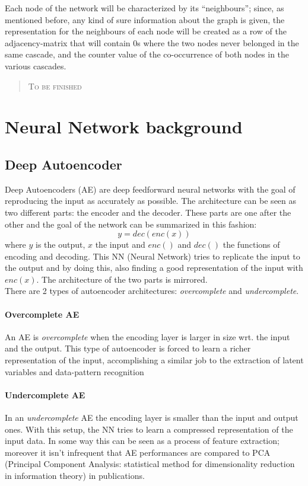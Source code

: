 \documentclass{article}
\begin{document}
			Each node of the network will be characterized by its \textquotedblleft neighbours\textquotedblright; since, as mentioned before, any kind of sure information about the graph is given, the representation for the neighbours of each node will be created as a row of the adjacency-matrix that will contain 0s where the two nodes never belonged in the same cascade, and the counter value of the co-occurrence of both nodes in the various cascades.
			\begin{quote}
				\centering
				\textsc{To be finished}\\
			\end{quote}
			\newpage
			
		\section{Neural Network background}
			\subsection{Deep Autoencoder}
			Deep Autoencoders (AE) are deep feedforward neural networks with the goal of reproducing the input as accurately as possible. The architecture can be seen as two different parts: the encoder and the decoder. These parts are one after the other and the goal of the network can be summarized in this fashion:
			$$y=dec(enc(x))$$
			where $y$ is the output, $x$ the input and $enc()$ and $dec()$ the functions of encoding and decoding. This NN (Neural Network) tries to replicate the input to the output and by doing this, also finding a good representation of the input with $enc(x)$. The architecture of the two parts is mirrored.\\
			There are 2 types of autoencoder architectures: \textit{overcomplete} and \textit{undercomplete}.
			\paragraph{Overcomplete AE}
			An AE is \textit{overcomplete} when the encoding layer is larger in size wrt. the input and the output. This type of autoencoder is forced to learn a richer representation of the input, accomplishing a similar job to the extraction of latent variables and data-pattern recognition
			\paragraph{Undercomplete AE}
			In an \textit{undercomplete} AE the encoding layer is smaller than the input and output ones. With this setup, the NN tries to learn a compressed representation of the input data. In some way this can be seen as a process of feature extraction; moreover it isn't infrequent that AE performances are compared to PCA (Principal Component Analysis: statistical method for dimensionality reduction in information theory) in publications.
			\par \noindent \newline
			\begin{figure}[h!]
				\centerline{}
			\end{figure}
			\newpage
			
\end{document}
